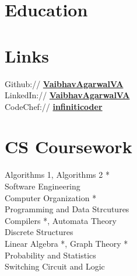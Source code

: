 \documentclass[a4paper]{deedy-resume} %
\begin{document}

\begin{minipage}[t]{0.33\textwidth} %

  \section{Education} 



  \sectionspace
  \sectionspace
  

  \sectionspace
  \sectionspace
  
    
  \sectionspace

  \section{Links} 

  Github:// \href{https://github.com/VaibhavAgarwalVA}{\bf VaibhavAgarwalVA} \\
  LinkedIn:// \href{https://www.linkedin.com/in/VaibhavAgarwalVA}{\bf VaibhavAgarwalVA} \\
  CodeChef:// \href{https://www.codechef.com/users/infiniticoder}{\bf infiniticoder} \\
  
  \sectionspace

  \section{CS Coursework}
  Algorithms 1, Algorithms 2 *\\
  Software Engineering \\
  Computer Organization *\\
  Programming and Data Strcutures\\
  Compilers *, Automata Theory\\
  Discrete Structures\\
  Linear Algebra *, Graph Theory *\\
  Probability and Statistics\\
  Switching Circuit and Logic \\


\end{minipage}
\end{document}
